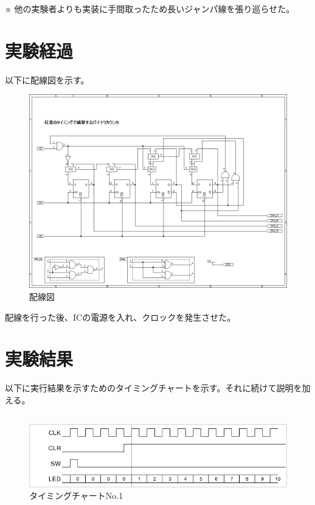 \documentclass{scrartcl}
\begin{document}
※ 他の実験者よりも実装に手間取ったため長いジャンパ線を張り巡らせた。\\

\section{実験経過}
\label{sec:org1325c74}

以下に配線図を示す。\\
\begin{figure}[htbp]
\centering
\includegraphics[width=.9\linewidth]{./logicex-2.png}
\caption{\label{fig:org661c980}
配線図}
\end{figure}
配線を行った後、ICの電源を入れ、クロックを発生させた。\\

\section{実験結果}
\label{sec:org5e15a91}
以下に実行結果を示すためのタイミングチャートを示す。それに続けて説明を加える。\\

\subsection{}
\label{sec:orgab83d07}
\begin{figure}[htbp]
\centering
\includegraphics[width=.9\linewidth]{./logic-1.png}
\caption{\label{fig:org6ca0bc6}
タイミングチャートNo.1}
\end{figure}
\end{document}
